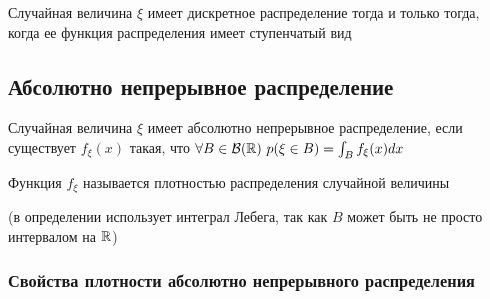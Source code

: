 \documentclass[12pt]{article}
\begin{document}
    \begin{MyTheorem}
        \Ths Случайная величина $\xi$ имеет дискретное распределение тогда и только тогда, когда ее функция распределения имеет ступенчатый вид
    \end{MyTheorem}

    \hypertarget{continuousdistributionproperties}{}

    \subsection{Абсолютно непрерывное распределение}

    \Def Случайная величина $\xi$ имеет абсолютно непрерывное распределение, если существует $f_\xi(x)$ такая, что $\forall B \in \mathcal{B}(\mathbb{R})
    \ p(\xi \in B) = \int_B f_\xi(x)dx$

    \hypertarget{densityfunctiondefinition}{}

    Функция $f_\xi$ называется плотностью распределения случайной величины

    (в определении использует интеграл Лебега, так как $B$ может быть не просто интервалом на $\mathbb{R}$)

    \hypertarget{densityfunctionproperties}{}

    \subsubsection{Свойства плотности абсолютно непрерывного распределения}
\end{document}

